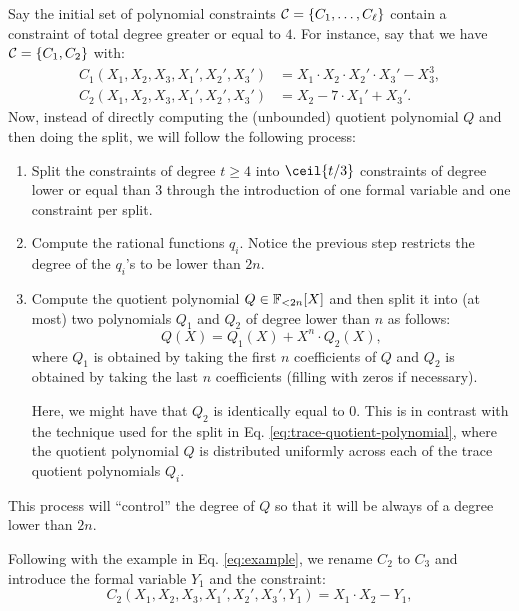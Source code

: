 Say the initial set of polynomial constraints $\mathcal{C} = \{C_1, \dots, C_\ell \}$ contain a constraint of total degree greater or equal to $4$. For instance, say that we have $\mathcal{C} = \{C_1,C_2\}$ with:
\begin{equation}\label{eq:example}
\begin{split}
  C_1(X_1,X_2,X_3,X_1',X_2',X_3') &= X_1 \cdot X_2 \cdot X_2' \cdot X_3' - X_3^3, \\[0.2cm]
  C_2(X_1,X_2,X_3,X_1',X_2',X_3') &= X_2 -7 \cdot X_1' + X_3'.
\end{split}
\end{equation}
Now, instead of directly computing the (unbounded) quotient polynomial $Q$ and then doing the split, we will follow the following process:
\begin{enumerate}
  \item Split the constraints of degree $t \geq 4$ into $\ceil{t/3}$ constraints of degree lower or equal than $3$ through the introduction of one formal variable and one constraint per split.
  \item Compute the rational functions $q_i$. Notice the previous step restricts the degree of the $q_i$'s to be lower than $2n$.
  \item Compute the quotient polynomial $Q \in \mathbb{F}_{<2n}[X]$ and then split it into (at most) two polynomials $Q_1$ and $Q_2$ of degree lower than $n$ as follows:
  \begin{equation}\label{eq:quotient-split}
    Q(X) = Q_1(X) + X^n \cdot Q_2(X),
  \end{equation}
  where $Q_1$ is obtained by taking the first $n$ coefficients of $Q$ and $Q_2$ is obtained by taking the last $n$ coefficients (filling with zeros if necessary).
  \begin{remark}
    Here, we might have that $Q_2$ is identically equal to $0$. This is in contrast with the technique used for the split in Eq. \eqref{eq:trace-quotient-polynomial}, where the quotient polynomial $Q$ is distributed uniformly across each of the trace quotient polynomials $Q_i$.
  \end{remark}
\end{enumerate}
This process will ``control'' the degree of $Q$ so that it will be always of a degree lower than $2n$.

Following with the example in Eq. \eqref{eq:example}, we rename $C_2$ to $C_3$ and introduce the formal variable $Y_1$ and the constraint:
\begin{equation}\label{eq:intermediate-constraint}
  C_2(X_1,X_2,X_3,X_1',X_2',X_3',Y_1) = X_1 \cdot X_2 - Y_1,
\end{equation}

